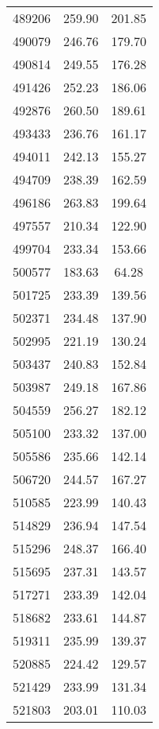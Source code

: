 \documentclass[main.tex]{subfiles}
\begin{document}
\begin{longtable}{ccc}
		489206     & 259.90       & 201.85       \\
		490079     & 246.76       & 179.70       \\
		490814     & 249.55       & 176.28       \\
		491426     & 252.23       & 186.06       \\
		492876     & 260.50       & 189.61       \\
		493433     & 236.76       & 161.17       \\
		494011     & 242.13       & 155.27       \\
		494709     & 238.39       & 162.59       \\
		496186     & 263.83       & 199.64       \\
		497557     & 210.34       & 122.90       \\
		499704     & 233.34       & 153.66       \\
		500577     & 183.63       & 64.28        \\
		501725     & 233.39       & 139.56       \\
		502371     & 234.48       & 137.90       \\
		502995     & 221.19       & 130.24       \\
		503437     & 240.83       & 152.84       \\
		503987     & 249.18       & 167.86       \\
		504559     & 256.27       & 182.12       \\
		505100     & 233.32       & 137.00       \\
		505586     & 235.66       & 142.14       \\
		506720     & 244.57       & 167.27       \\
		510585     & 223.99       & 140.43       \\
		514829     & 236.94       & 147.54       \\
		515296     & 248.37       & 166.40       \\
		515695     & 237.31       & 143.57       \\
		517271     & 233.39       & 142.04       \\
		518682     & 233.61       & 144.87       \\
		519311     & 235.99       & 139.37       \\
		520885     & 224.42       & 129.57       \\
		521429     & 233.99       & 131.34       \\
		521803     & 203.01       & 110.03       \\

\end{longtable}
\end{document}
